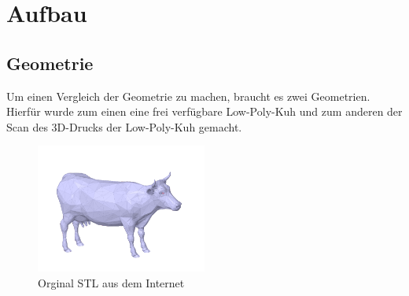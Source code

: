 \documentclass[a4paper,12pt]{article}
\begin{document}
\section{Aufbau}

\subsection{Geometrie}
Um einen Vergleich der Geometrie zu machen, braucht es zwei Geometrien. Hierfür wurde zum einen eine frei verfügbare Low-Poly-Kuh und zum anderen der Scan des 3D-Drucks der Low-Poly-Kuh gemacht.

\begin{figure}[h]
    \centering
    \includegraphics[width=0.5\textwidth]{cow.PNG}
    \caption{Orginal STL aus dem Internet}
    \label{fig:Orggeometry}
\end{figure}
\end{document}
